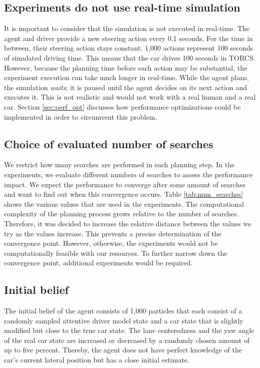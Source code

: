 \subsection{Experiments do not use real-time simulation}

It is important to consider that the simulation is not executed in real-time. The agent and driver provide a new steering action every 0.1 seconds. For the time in between, their steering action stays constant. 1,000 actions represent 100 seconds of simulated driving time. This means that the car drives 100 seconds in TORCS. However, because the planning time before each action may be substantial, the experiment execution can take much longer in real-time. While the agent plans, the simulation \emph{waits}; it is paused until the agent decides on its next action and executes it. This is not realistic and would not work with a real human and a real car. Section \ref{sec:perf_opt} discusses how performance optimizations could be implemented in order to circumvent this problem. 

\subsection{Choice of evaluated number of searches}

 

We restrict how many searches are performed in each planning step. In the experiments, we evaluate different numbers of searches to assess the performance impact. We expect the performance to converge after some amount of searches and want to find out when this convergence occurs. Table \ref{tab:num_searches} shows the various values that are used in the experiments. The computational complexity of the planning process grows relative to the number of searches. Therefore, it was decided to increase the relative distance between the values we try as the values increase. This prevents a precise determination of the convergence point. However, otherwise, the experiments would not be computationally feasible with our resources. To further narrow down the convergence point, additional experiments would be required.

\subsection{Initial belief}

The initial belief of the agent consists of 1,000 particles that each consist of a randomly sampled attentive driver model state and a car state that is slightly modified but close to the true car state. The lane centeredness and the yaw angle of the real car state are increased or decreased by a randomly chosen amount of up to five percent. Thereby, the agent does not have perfect knowledge of the car's current lateral position but has a close initial estimate.

